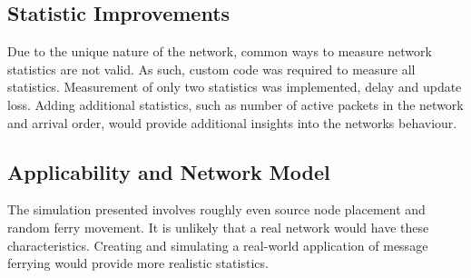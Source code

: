 \subsection{Statistic Improvements}

Due to the unique nature of the network, common ways to measure network statistics are not valid.
As such, custom code was required to measure all statistics.
Measurement of only two statistics was implemented, delay and update loss.
Adding additional statistics, such as number of active packets in the network and arrival order, would provide additional insights into the networks behaviour.

\subsection{Applicability and Network Model}

The simulation presented involves roughly even source node placement and random ferry movement.
It is unlikely that a real %
network would have these characteristics.
Creating and simulating a real-world application of message ferrying would provide more realistic statistics.


